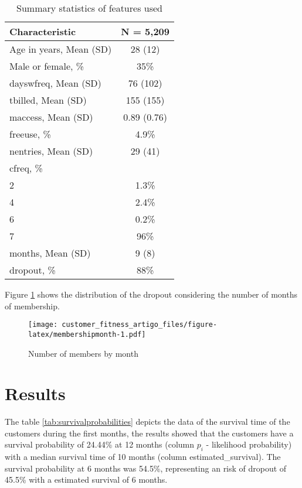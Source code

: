 \documentclass[
  12pt,
]{article}
\begin{document}
\begin{table}

\caption{\label{tab:summarytable}Summary statistics of features used}
\centering
\begin{tabular}[t]{lc}
\toprule
\textbf{Characteristic} & \textbf{N = 5,209}\\
\midrule
Age in years, Mean (SD) & 28 (12)\\
Male or female, \% & 35\%\\
dayswfreq, Mean (SD) & 76 (102)\\
tbilled, Mean (SD) & 155 (155)\\
maccess, Mean (SD) & 0.89 (0.76)\\
\addlinespace
freeuse, \% & 4.9\%\\
nentries, Mean (SD) & 29 (41)\\
cfreq, \% & \\
\hspace{1em}2 & 1.3\%\\
\hspace{1em}4 & 2.4\%\\
\addlinespace
\hspace{1em}6 & 0.2\%\\
\hspace{1em}7 & 96\%\\
months, Mean (SD) & 9 (8)\\
dropout, \% & 88\%\\
\bottomrule
\end{tabular}
\end{table}

Figure \ref{fig:membershipmonth} shows the distribution of the dropout
considering the number of months of membership.

\begin{figure}
\centering
\texttt{[image: customer\_fitness\_artigo\_files/figure-latex/membershipmonth-1.pdf]}
\caption{\label{fig:membershipmonth}Number of members by month}
\end{figure}

\hypertarget{results}{%
\section{Results}\label{results}}

The table \ref{tab:survivalprobabilities} depicts the data of the survival time of the customers
during the first months, the results showed that the customers have a survival probability of 24.44\%
at 12 months (column \(p_i\) - likelihood probability) with a median survival time of 10 months
(column estimated\_survival).
The survival probability at 6 months was 54.5\%, representing an risk of dropout of
45.5\% with a estimated survival of 6 months.
\end{document}
